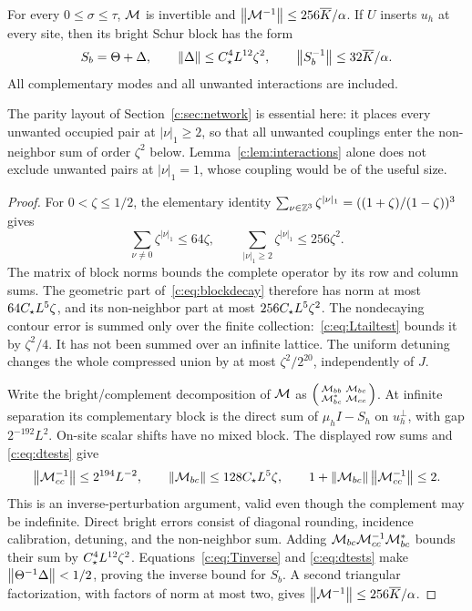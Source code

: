 \begin{lemma}
\label{c:lem:assembly}
For every $0\le\sigma\le\tau$, $\mathcal M$ is invertible and
$\left\lVert \mathcal M^{-1}\right\rVert\le256\overline K/\alpha$. If $U$ inserts $u_h$ at every site,
then its bright Schur block has the form
\begin{equation}
 S_b=\Theta+\Delta,\qquad
 \left\lVert \Delta\right\rVert\le C_\star^4L^{12}\zeta^2,
 \qquad \left\lVert S_b^{-1}\right\rVert\le32\overline K/\alpha.                \label{c:eq:bright}
\end{equation}
All complementary modes and all unwanted interactions are included.
\end{lemma}
The parity layout of Section~\ref{c:sec:network} is essential here:
it places every unwanted occupied pair at $|\nu|_1\ge2$, so that all
unwanted couplings enter the non-neighbor sum of order $\zeta^2$ below.
Lemma~\ref{c:lem:interactions} alone does not exclude unwanted pairs at
$|\nu|_1=1$, whose coupling would be of the useful size.
\begin{proof}
For $0<\zeta\le1/2$, the elementary identity
$\sum_{\nu\in\mathbb Z^3}\zeta^{|\nu|_1}=((1+\zeta)/(1-\zeta))^3$ gives
\[
 \sum_{\nu\ne0}\zeta^{|\nu|_1}\le64\zeta,
 \qquad\sum_{|\nu|_1\ge2}\zeta^{|\nu|_1}\le256\zeta^2.
\]
The matrix of block norms bounds the complete operator by its row and
column sums. The geometric part of~\eqref{c:eq:blockdecay} therefore
has norm at most $64C_\star L^5\zeta$, and its non-neighbor part at most
$256C_\star L^5\zeta^2$. The nondecaying contour error is summed only
over the finite collection:~\eqref{c:eq:Ltailtest} bounds it by
$\zeta^2/4$. It has not been summed over an infinite lattice.
The uniform detuning changes the whole compressed union by at most
$\zeta^2/2^{20}$, independently of $J$.

Write the bright/complement decomposition of $\mathcal M$ as
$\left(\begin{smallmatrix}\mathcal M_{bb}&\mathcal M_{bc}\\\mathcal M_{bc}^*&\mathcal M_{cc}\end{smallmatrix}\right)$.
At infinite separation its complementary block is the direct sum of
$\mu_hI-S_h$ on $u_h^\perp$, with gap $2^{-192}L^2$.
On-site scalar shifts have no mixed block. The displayed row sums and
\eqref{c:eq:dtests} give
\[
 \left\lVert \mathcal M_{cc}^{-1}\right\rVert\le2^{194}L^{-2},\qquad
 \left\lVert \mathcal M_{bc}\right\rVert\le128C_\star L^5\zeta,\qquad
 1+\left\lVert \mathcal M_{bc}\right\rVert\left\lVert \mathcal M_{cc}^{-1}\right\rVert\le2.
\]
This is an inverse-perturbation argument, valid even though the
complement may be indefinite. Direct bright errors consist of diagonal
rounding, incidence calibration, detuning, and the non-neighbor sum.
Adding $\mathcal M_{bc}\mathcal M_{cc}^{-1}\mathcal M_{bc}^*$ bounds their sum by
$C_\star^4L^{12}\zeta^2$. Equations~\eqref{c:eq:Tinverse} and
\eqref{c:eq:dtests} make $\left\lVert \Theta^{-1}\Delta\right\rVert<1/2$, proving the inverse
bound for $S_b$. A second triangular factorization, with factors of
norm at most two, gives $\left\lVert \mathcal M^{-1}\right\rVert\le256\overline K/\alpha$.
\end{proof}

